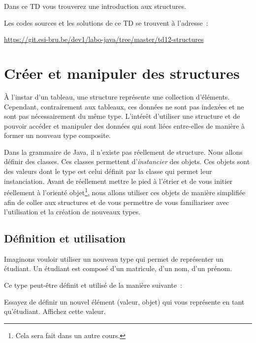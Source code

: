 \documentclass[a4paper,11pt]{article}
\date{2018 -- 2019}
\newcommand{\publicbasepath}{https://git.esi-bru.be/dev1/labo-java/tree/master/td12-structures}
\begin{document}
\entete
\titre
{}
\lastedit


	Dans ce TD vous trouverez une introduction aux structures.
	 
	Les codes sources et les solutions de ce TD se trouvent à l'adresse~: 
	
	\url{\publicbasepath}	


	\tableofcontents

	\newpage

\section{Créer et manipuler des structures}

	À l'instar d'un tableau, une structure représente une collection d'éléments. Cependant, contrairement aux tableaux, ces données ne sont pas indexées et ne sont pas nécessairement du même type. L'intérêt d'utiliser une structure et de pouvoir accéder et manipuler des données qui sont liées entre-elles de manière à former un nouveau type composite.

	Dans la grammaire de Java, il n'existe pas réellement de structure. Nous allons définir des classes. Ces classes permettent d'\emph{instancier} des objets. Ces objets sont des valeurs dont le type est celui définit par la classe qui permet leur instanciation.
	Avant de réellement mettre le pied à l'étrier et de vous initier réellement à l'orienté objet\footnote{Cela sera fait dans un autre cours.}, nous allons utiliser ces objets de manière simplifiée afin de coller aux structures et de vous permettre de vous familiariser avec l'utilisation et la création de nouveaux types.


	\subsection{Définition et utilisation}

	Imaginons vouloir utiliser un nouveau type qui permet de représenter un étudiant. Un étudiant est composé d'un matricule, d'un nom, d'un prénom.

	Ce type peut-être définit et utilisé de la manière suivante~:


	Essayez de définir un nouvel élément (valeur, objet) qui vous représente en tant qu'étudiant. Affichez cette valeur.
\end{document}

